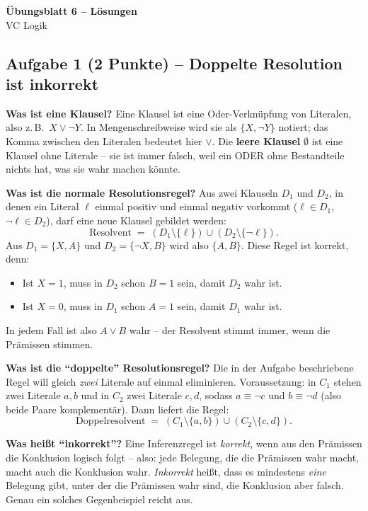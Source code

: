 \documentclass[a4paper,12pt]{article}
\begin{document}
\begin{center}
{\LARGE\bfseries \"Ubungsblatt 6 -- L\"osungen}\\[0.5em]
{\large VC Logik}
\end{center}

\bigskip

\subsection*{Aufgabe 1 \textnormal{(2 Punkte)} -- Doppelte Resolution ist inkorrekt}

\textbf{Was ist eine Klausel?}
Eine Klausel ist eine Oder-Verkn\"upfung von Literalen, also z.\,B.\
$X \vee \neg Y$. In Mengenschreibweise wird sie als $\{X, \neg Y\}$ notiert;
das Komma zwischen den Literalen bedeutet hier $\vee$. Die \textbf{leere
Klausel} $\emptyset$ ist eine Klausel ohne Literale -- sie ist immer falsch,
weil ein ODER ohne Bestandteile nichts hat, was sie wahr machen k\"onnte.

\medskip
\textbf{Was ist die normale Resolutionsregel?}
Aus zwei Klauseln $D_1$ und $D_2$, in denen ein Literal $\ell$ einmal
positiv und einmal negativ vorkommt ($\ell \in D_1$, $\neg\ell \in D_2$),
darf eine neue Klausel gebildet werden:
\[
\text{Resolvent} \;=\; (D_1 \setminus \{\ell\}) \cup (D_2 \setminus \{\neg\ell\}).
\]
Aus $D_1 = \{X, A\}$ und $D_2 = \{\neg X, B\}$ wird also $\{A, B\}$.
Diese Regel ist korrekt, denn:
\begin{itemize}[nosep]
\item Ist $X = 1$, muss in $D_2$ schon $B = 1$ sein, damit $D_2$ wahr ist.
\item Ist $X = 0$, muss in $D_1$ schon $A = 1$ sein, damit $D_1$ wahr ist.
\end{itemize}
In jedem Fall ist also $A \vee B$ wahr -- der Resolvent stimmt immer, wenn
die Pr\"amissen stimmen.

\medskip
\textbf{Was ist die ``doppelte'' Resolutionsregel?}
Die in der Aufgabe beschriebene Regel will gleich \emph{zwei} Literale
auf einmal eliminieren. Voraussetzung: in $C_1$ stehen zwei Literale $a, b$
und in $C_2$ zwei Literale $c, d$, sodass $a \equiv \neg c$ und
$b \equiv \neg d$ (also beide Paare komplement\"ar). Dann liefert die
Regel:
\[
\text{Doppelresolvent} \;=\; (C_1 \setminus \{a, b\}) \cup (C_2 \setminus \{c, d\}).
\]

\medskip
\textbf{Was hei\ss t ``inkorrekt''?}
Eine Inferenzregel ist \emph{korrekt}, wenn aus den Pr\"amissen die
Konklusion logisch folgt -- also: jede Belegung, die die Pr\"amissen wahr
macht, macht auch die Konklusion wahr. \emph{Inkorrekt} hei\ss t, dass es
mindestens \emph{eine} Belegung gibt, unter der die Pr\"amissen wahr sind,
die Konklusion aber falsch. Genau ein solches Gegenbeispiel reicht aus.
\end{document}
